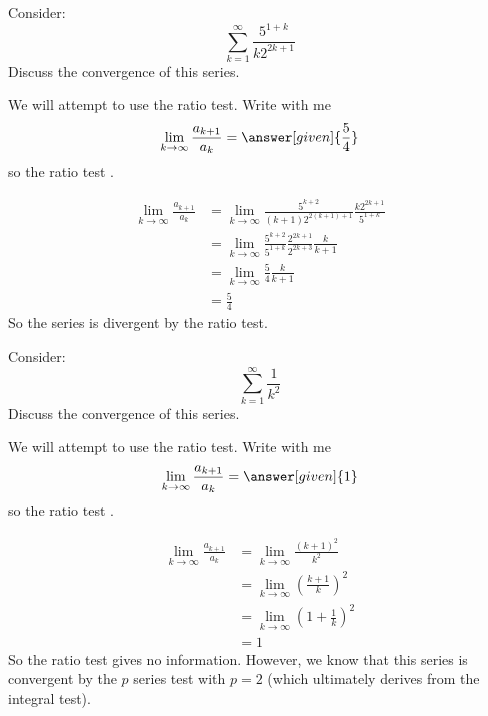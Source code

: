 \documentclass{ximera}
\begin{document}
\begin{example}
  Consider:
  \[
  \sum_{k=1}^\infty \frac{5^{1+k}}{k 2^{2k+1}}
  \]
  Discuss the convergence of this series.
  \begin{explanation}
    We will attempt to use the ratio test. Write with me
    \[
    \lim_{k \to \infty} \frac{a_{k+1}}{a_k} = \answer[given]{\frac{5}{4}}
    \]
    so the ratio test
    . 
    \begin{hint}
      \begin{align*}
	\lim_{k \to \infty} \frac{a_{k+1}}{a_k} &= \lim_{k \to \infty} \frac{5^{k+2}}{(k+1)2^{2(k+1)+1}} \frac{k 2^{2k+1}}{5^{1+k}}\\
	&=\lim_{k \to \infty} \frac{5^{k+2}}{5^{1+k}} \frac{2^{2k+1}}{2^{2k+3}} \frac{k}{k+1}\\
	&=\lim_{k \to \infty} \frac{5}{4} \frac{k}{k+1}\\
	&=\frac{5}{4}
      \end{align*}	
      So the series is divergent by the ratio test.
    \end{hint}
  \end{explanation}
\end{example}


\begin{example}
  Consider:	
  \[
  \sum_{k=1}^\infty \frac{1}{k^2}
  \]
  Discuss the convergence of this series.
  \begin{explanation}
    We will attempt to use the ratio test. Write with me
    \[ 
    \lim_{k \to \infty} \frac{a_{k+1}}{a_k} = \answer[given]{1}	
    \]
    so the ratio test
    .		
    \begin{hint}
      \begin{align*}
	\lim_{k \to \infty} \frac{a_{k+1}}{a_k} &= \lim_{k \to \infty} \frac{(k+1)^2}{k^2}\\
	&= \lim_{k \to \infty} \left( \frac{k+1}{k}\right)^2\\
	&= \lim_{k \to \infty} \left( 1+\frac{1}{k}\right)^2\\
	&= 1
      \end{align*}
      So the ratio test gives no information.  However, we know that
      this series is convergent by the $p$ series test with $p=2$
      (which ultimately derives from the integral test).
    \end{hint}
  \end{explanation}
\end{example}
\end{document}
